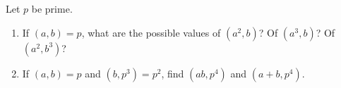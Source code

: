 \documentclass{ximera}
\begin{document}
\begin{br}
	Let $p$ be prime.
	\begin{enumerate}
		\item If $(a,b)=p$, what are the possible values of $(a^2,b)$? Of $(a^3,b)$? Of $(a^2,b^3)$?
		
			
		\item If $(a,b)=p$ and $(b,p^3)=p^2$, find $(ab,p^4)$ and $(a+b,p^4)$.
		
	\end{enumerate}
\end{br}

\end{document}
